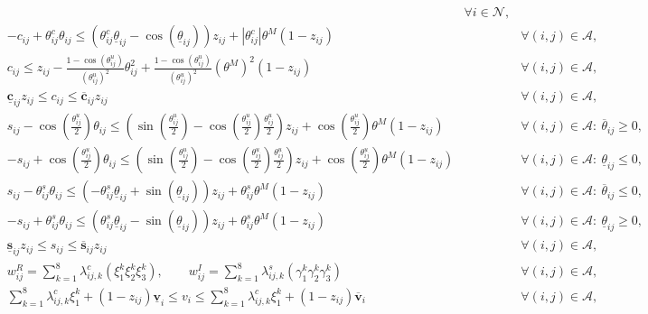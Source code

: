 \documentclass{article}
\begin{document}
\begin{equation}
\begin{aligned}
&& \forall i\in\mathcal{N}, \\
& -c_{ij} + \theta_{ij}^c \theta_{ij}
\le
(\theta_{ij}^c \underline{\theta}_{ij} - \cos(\underline{\theta}_{ij})) z_{ij}
+ |\theta_{ij}^c| \theta^M (1-z_{ij})
&& \forall (i,j)\in\mathcal{A}, \\
& c_{ij} \le z_{ij}
- \frac{1-\cos(\theta_{ij}^u)}{(\theta_{ij}^u)^2}\theta_{ij}^2
+ \frac{1-\cos(\theta_{ij}^u)}{(\theta_{ij}^u)^2}(\theta^M)^2(1-z_{ij})
&& \forall (i,j)\in\mathcal{A}, \\
& \underline{\boldsymbol{c}}_{ij} z_{ij} \le c_{ij} \le \overline{\boldsymbol{c}}_{ij} z_{ij}
&& \forall (i,j)\in\mathcal{A}, \\
& s_{ij} - \cos\!\left(\frac{\theta_{ij}^u}{2}\right)\theta_{ij}
\le
\left(\sin\!\left(\frac{\theta_{ij}^u}{2}\right)-\cos\!\left(\frac{\theta_{ij}^u}{2}\right)\frac{\theta_{ij}^u}{2}\right)z_{ij}
+ \cos\!\left(\frac{\theta_{ij}^u}{2}\right)\theta^M(1-z_{ij})
&& \forall (i,j)\in\mathcal{A}:\ \overline{\theta}_{ij}\ge 0, \\
& -s_{ij} + \cos\!\left(\frac{\theta_{ij}^u}{2}\right)\theta_{ij}
\le
\left(\sin\!\left(\frac{\theta_{ij}^u}{2}\right)-\cos\!\left(\frac{\theta_{ij}^u}{2}\right)\frac{\theta_{ij}^u}{2}\right)z_{ij}
+ \cos\!\left(\frac{\theta_{ij}^u}{2}\right)\theta^M(1-z_{ij})
&& \forall (i,j)\in\mathcal{A}:\ \underline{\theta}_{ij}\le 0, \\
& s_{ij} - \theta_{ij}^s \theta_{ij}
\le
(-\theta_{ij}^s \underline{\theta}_{ij} + \sin(\underline{\theta}_{ij})) z_{ij}
+ \theta_{ij}^s \theta^M (1-z_{ij})
&& \forall (i,j)\in\mathcal{A}:\ \overline{\theta}_{ij}\le 0, \\
& -s_{ij} + \theta_{ij}^s \theta_{ij}
\le
(\theta_{ij}^s \underline{\theta}_{ij} - \sin(\underline{\theta}_{ij})) z_{ij}
+ \theta_{ij}^s \theta^M (1-z_{ij})
&& \forall (i,j)\in\mathcal{A}:\ \underline{\theta}_{ij}\ge 0, \\
& \underline{\boldsymbol{s}}_{ij} z_{ij} \le s_{ij} \le \overline{\boldsymbol{s}}_{ij} z_{ij}
&& \forall (i,j)\in\mathcal{A}, \\
& w_{ij}^R = \sum_{k=1}^{8} \lambda_{ij,k}^c (\xi_1^k \xi_2^k \xi_3^k),\qquad
w_{ij}^I = \sum_{k=1}^{8} \lambda_{ij,k}^s (\gamma_1^k \gamma_2^k \gamma_3^k)
&& \forall (i,j)\in\mathcal{A}, \\
& \sum_{k=1}^{8} \lambda_{ij,k}^c \xi_1^k + (1-z_{ij})\underline{\boldsymbol{v}}_i
\le v_i \le
\sum_{k=1}^{8} \lambda_{ij,k}^c \xi_1^k + (1-z_{ij})\overline{\boldsymbol{v}}_i
&& \forall (i,j)\in\mathcal{A}, \\

\end{aligned}
\end{equation}
\end{document}
